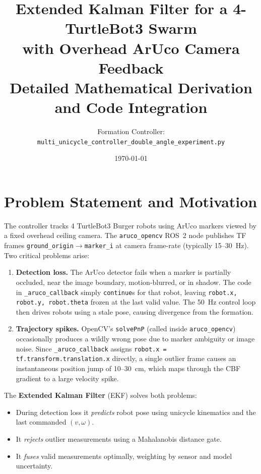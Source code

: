 \documentclass[12pt,a4paper]{article}
\title{\textbf{Extended Kalman Filter for a 4-TurtleBot3 Swarm}\\
       \textbf{with Overhead ArUco Camera Feedback}\\[0.5em]
       \large Detailed Mathematical Derivation and Code Integration}
\author{Formation Controller: \texttt{multi\_unicycle\_controller\_double\_angle\_experiment.py}}
\date{\today}
\begin{document}
\maketitle\tableofcontents\newpage

\section{Problem Statement and Motivation}

The controller tracks 4 TurtleBot3 Burger robots using ArUco markers viewed by
a fixed overhead ceiling camera. The \texttt{aruco\_opencv} ROS~2 node publishes
TF frames \texttt{ground\_origin}$\to$\texttt{marker\_i} at camera frame-rate
(typically 15--30~Hz). Two critical problems arise:

\begin{enumerate}
\item \textbf{Detection loss.}
  The ArUco detector fails when a marker is partially occluded, near the image
  boundary, motion-blurred, or in shadow. The code in \texttt{\_aruco\_callback}
  simply \texttt{continue}s for that robot, leaving \texttt{robot.x, robot.y,
  robot.theta} frozen at the last valid value. The 50~Hz control loop then drives
  robots using a stale pose, causing divergence from the formation.

\item \textbf{Trajectory spikes.}
  OpenCV's \texttt{solvePnP} (called inside \texttt{aruco\_opencv}) occasionally
  produces a wildly wrong pose due to marker ambiguity or image noise. Since
  \texttt{\_aruco\_callback} assigns \texttt{robot.x = tf.transform.translation.x}
  directly, a single outlier frame causes an instantaneous position jump of
  10--30~cm, which maps through the CBF gradient to a large velocity spike.
\end{enumerate}

The \textbf{Extended Kalman Filter} (EKF) solves both problems:
\begin{itemize}
  \item During detection loss it \emph{predicts} robot pose using unicycle
        kinematics and the last commanded $(v,\omega)$.
  \item It \emph{rejects} outlier measurements using a Mahalanobis distance gate.
  \item It \emph{fuses} valid measurements optimally, weighting by sensor and
        model uncertainty.
\end{itemize}
\end{document}
